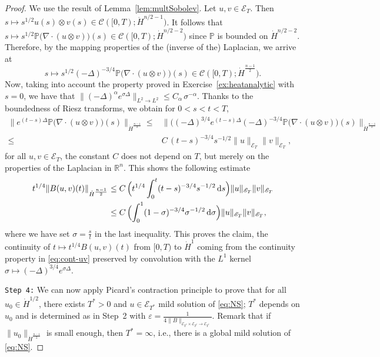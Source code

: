 \documentclass[a4paper, 12pt]{article}
\theoremstyle{plain}
\theoremstyle{definition}
\theoremstyle{remark}
\numberwithin{equation}{section}
\begin{document}
\begin{proof}
We use the result of Lemma~\ref{lem:multSobolev}.
Let $u,v\in{\mathscr{E}}_{T}$. Then 
$s\mapsto s^{1/2}u(s)\otimes v(s)\in{\mathscr{C}}([0,T);\dot H^{n/2-1})$. It follows that
$s\mapsto s^{1/2}{\mathbb{P}}\bigl(\nabla\cdot (u\otimes v)\bigr)(s)\in {\mathscr{C}}([0,T);\dot H^{n/2-2})$ 
since ${\mathbb{P}}$ is bounded on $\dot H^{n/2-2}$.
Therefore, by the mapping properties of the (inverse of the) Laplacian, we arrive at
%
\begin{equation}
\label{eq:cont-uv}
s\mapsto s^{1/2}(-\Delta)^{-3/4}{\mathbb{P}}\bigl(\nabla\cdot (u\otimes v)\bigr)(s)\in {\mathscr{C}}([0,T);\dot H^{\frac{n-1}{2}}).
\end{equation}
%
Now, taking into account the property proved in Exercise~\ref{ex:heatanalytic} with $s=0$, we have
that $\|(-\Delta)^\alpha e^{\sigma\Delta}\|_{L^2\to L^2}\le C_\alpha\,\sigma^{-\alpha}$. Thanks to
the boundedness of Riesz transforms, we obtain for $0<s<t<T$,
%
\begin{align}
\label{eq:est-Bbis}
\bigl\|e^{(t-s)\Delta}{\mathbb{P}}\bigl(\nabla\cdot(u\otimes v)\bigr)(s)\bigr\|_{\dot H^{\frac{n-1}{2}}}
\le &\bigl\|\bigl((-\Delta)^{3/4}e^{(t-s)\Delta}
(-\Delta)^{-3/4}{\mathbb{P}}\bigl(\nabla\cdot(u\otimes v)\bigr)(s)\bigr\|_{\dot H^{\frac{n-1}{2}}}
\nonumber\\
\le &C\,(t-s)^{-3/4}s^{-1/2}\|u\|_{{\mathscr{E}}_{T}}\|v\|_{{\mathscr{E}}_{T}},
\end{align}
%
for all $u,v\in {\mathscr{E}}_{T}$, the constant $C$ does not depend on $T$, but merely on
the properties of the Laplacian in ${\mathbb{R}}^n$. This shows the following estimate
%
\begin{align*}
t^{1/4}\|B(u,v)(t)\|_{\dot H^{\frac{n-1}{2}}}
&\le C\,\Bigl(t^{1/4}\int_0^t (t-s)^{-3/4}s^{-1/2}\,{\rm d}s\Bigr)
\|u\|_{{\mathscr{E}}_{T}}\|v\|_{{\mathscr{E}}_{T}}\\
&\le C\,\Bigl(\int_0^1(1-\sigma)^{-3/4}\sigma^{-1/2}\,{\rm d}\sigma\Bigr)
\|u\|_{{\mathscr{E}}_{T}}\|v\|_{{\mathscr{E}}_{T}},
\end{align*}
%
where we have set $\sigma=\frac{s}{t}$ in the last inequality. This proves the claim, the 
continuity of $t\mapsto t^{1/4} B(u,v)(t)$ from $[0,T)$ to $\dot H^1$ coming from the 
continuity property in \eqref{eq:cont-uv} preserved by convolution with the $L^1$ kernel
$\sigma\mapsto (-\Delta)^{3/4}e^{\sigma\Delta}$.

\medskip

\noindent
{\tt Step 4:} 
We can now apply Picard's contraction principle to prove that for all $u_0\in \dot H^{1/2}$,
there exists $T^*>0$ and $u\in {\mathscr{E}}_{T^*}$ mild solution of \eqref{eq:NS}; $T^*$ depends
on $u_0$ and is determined as in Step~2 with 
$\varepsilon=\frac{1}{4\| B\|_{{\mathscr{E}}_{T^*}\times{\mathscr{E}}_{T^*}\to{\mathscr{E}}_{T^*}}}$.
Remark that if $\|u_0\|_{\dot H^{\frac{n-1}{2}}}$ is small enough, then $T^*=\infty$, i.e., there is a global 
mild solution of \eqref{eq:NS}.


\end{proof}
\end{document}
